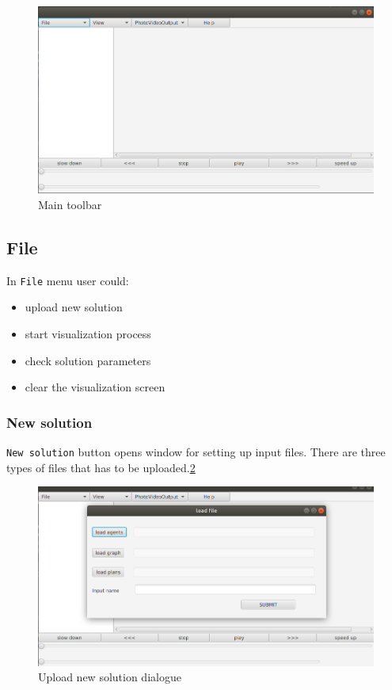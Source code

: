 \documentclass[thesis=B,english]{FITthesis}[2019/12/23]
\begin{document}
\begin{figure}
	\includegraphics[scale=0.34]{main.png}
	\caption[Main toolbar]{Main toolbar}\label{fig:float10}
\end{figure}


\subsection{File}

In \verb|File| menu user could:
\begin{itemize}
\item upload new solution
\item start visualization process
\item check solution parameters 
\item clear the visualization screen  
\end{itemize}

\subsubsection{New solution}

\verb|New solution| button opens window for setting up input files. There are three types of files that has to be uploaded.\ref{fig:float11}

\begin{figure}
	\includegraphics[scale=0.34]{loadfile.png}
	\caption[Load file]{Upload new solution dialogue}\label{fig:float11}
\end{figure}
\end{document}
